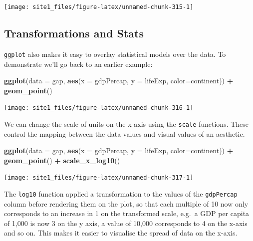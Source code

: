 \documentclass[]{book}
\newenvironment{Shaded}{\begin{snugshade}}{\end{snugshade}}
\newcommand{\KeywordTok}[1]{\textcolor[rgb]{0.13,0.29,0.53}{\textbf{#1}}}
\newcommand{\DataTypeTok}[1]{\textcolor[rgb]{0.13,0.29,0.53}{#1}}
\newcommand{\StringTok}[1]{\textcolor[rgb]{0.31,0.60,0.02}{#1}}
\newcommand{\OperatorTok}[1]{\textcolor[rgb]{0.81,0.36,0.00}{\textbf{#1}}}
\newcommand{\NormalTok}[1]{#1}
\begin{document}
\begin{center}\texttt{[image: site1\_files/figure-latex/unnamed-chunk-315-1]} \end{center}

\subsection{Transformations and Stats}\label{transformations-and-stats}

\texttt{ggplot} also makes it easy to overlay statistical models over
the data. To demonstrate we'll go back to an earlier example:

\begin{Shaded}
\begin{Highlighting}[]
\KeywordTok{ggplot}\NormalTok{(}\DataTypeTok{data =}\NormalTok{ gap, }\KeywordTok{aes}\NormalTok{(}\DataTypeTok{x =}\NormalTok{ gdpPercap, }\DataTypeTok{y =}\NormalTok{ lifeExp, }\DataTypeTok{color=}\NormalTok{continent)) }\OperatorTok{+}\StringTok{ }
\StringTok{  }\KeywordTok{geom_point}\NormalTok{()}
\end{Highlighting}
\end{Shaded}

\begin{center}\texttt{[image: site1\_files/figure-latex/unnamed-chunk-316-1]} \end{center}

We can change the scale of units on the x-axis using the \texttt{scale}
functions. These control the mapping between the data values and visual
values of an aesthetic.

\begin{Shaded}
\begin{Highlighting}[]
\KeywordTok{ggplot}\NormalTok{(}\DataTypeTok{data =}\NormalTok{ gap, }\KeywordTok{aes}\NormalTok{(}\DataTypeTok{x =}\NormalTok{ gdpPercap, }\DataTypeTok{y =}\NormalTok{ lifeExp, }\DataTypeTok{color=}\NormalTok{continent)) }\OperatorTok{+}\StringTok{ }
\StringTok{  }\KeywordTok{geom_point}\NormalTok{() }\OperatorTok{+}\StringTok{ }
\StringTok{  }\KeywordTok{scale_x_log10}\NormalTok{()}
\end{Highlighting}
\end{Shaded}

\begin{center}\texttt{[image: site1\_files/figure-latex/unnamed-chunk-317-1]} \end{center}

The \texttt{log10} function applied a transformation to the values of
the \texttt{gdpPercap} column before rendering them on the plot, so that
each multiple of 10 now only corresponds to an increase in 1 on the
transformed scale, e.g.~a GDP per capita of 1,000 is now 3 on the y
axis, a value of 10,000 corresponds to 4 on the x-axis and so on. This
makes it easier to visualise the spread of data on the x-axis.
\end{document}
